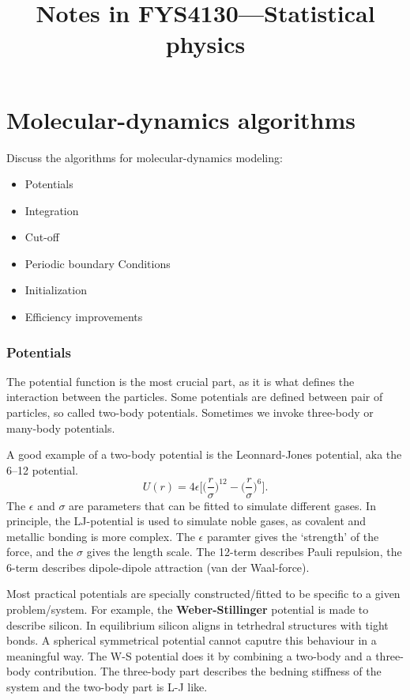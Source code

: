 \documentclass[a4paper, 11pt, notitlepage, english]{article}
\author{}
\title{Notes in FYS4130---Statistical physics}
\renewcommand{\b}{\bigg}
\newcommand{\eps}{\epsilon}
\begin{document}




\section{Molecular-dynamics algorithms}

Discuss the algorithms for molecular-dynamics modeling:
\begin{itemize}
	\item Potentials
	\item Integration
	\item Cut-off
	\item Periodic boundary Conditions
	\item Initialization
	\item Efficiency improvements
\end{itemize}

\subsubsection*{Potentials}

The potential function is the most crucial part, as it is what defines the interaction between the particles. Some potentials are defined between pair of particles, so called two-body potentials. Sometimes we invoke three-body or many-body potentials.

A good example of a two-body potential is the Leonnard-Jones potential, aka the 6--12 potential.
$$U(r) = 4\eps \bigg[\b(\frac{r}{\sigma}\b)^{12} - \b(\frac{r}{\sigma}\b)^6\bigg].$$
The $\eps$ and $\sigma$ are parameters that can be fitted to simulate different gases. In principle, the LJ-potential is used to simulate noble gases, as covalent and metallic bonding is more complex. The $\eps$ paramter gives the `strength' of the force, and the $\sigma$ gives the length scale. The 12-term describes Pauli repulsion, the 6-term describes dipole-dipole attraction (van der Waal-force).

Most practical potentials are specially constructed/fitted to be specific to a given problem/system. For example, the \textbf{Weber-Stillinger} potential is made to describe silicon. In equilibrium silicon aligns in tetrhedral structures with tight bonds. A spherical symmetrical potential cannot caputre this behaviour in a meaningful way. The W-S potential does it by combining a two-body and a three-body contribution. The three-body part describes the bedning stiffness of the system and the two-body part is L-J like.
\end{document}
